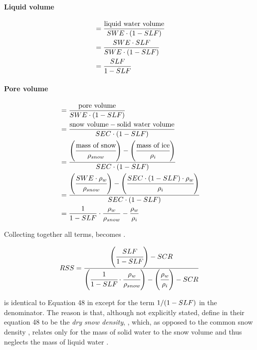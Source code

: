 \paragraph{Liquid volume}
\begin{align*}
  & = \frac{\text{liquid water volume}}{SWE \cdot (1-SLF)} \\
  & = \frac{SWE \cdot SLF}{SWE  \cdot (1-SLF)} \\
  & = \frac{SLF}{1-SLF}
\end{align*}

\paragraph{Pore volume}
\begin{align*}
 & = \frac{\text{pore volume}}{SWE \cdot (1-SLF)} \\
 & = \frac{\text{snow volume} - \text{solid water volume}}{SEC \cdot (1-SLF)} \\
 & = \frac{\left( \cfrac{\text{mass of snow}}{\rho_{snow}} \right) - \left( \cfrac{\text{mass of ice}}{\rho_{i}} \right)}{SEC \cdot (1-SLF)} \\
 & = \frac{ \left( \cfrac{SWE \cdot \rho_{w}}{\rho_{snow}} \right) - \left( \cfrac{SEC \cdot (1-SLF) \cdot \rho_{w}}{\rho_{i}} \right)}{SEC \cdot (1-SLF)} \\
 & = \frac{1}{1-SLF} \cdot \frac{\rho_{w}}{\rho_{snow}} - \frac{\rho_{w}}{\rho_{i}}
\end{align*}

Collecting together all terms,  becomes .

\begin{equation} \label{eqn:snow-enBal_relSat-symb}
  RSS{} = \frac{\left( \cfrac{SLF}{1-SLF} \right)-SCR}{\left( \cfrac{1}{1-SLF} \cdot \cfrac{\rho_{w}}{\rho_{snow}} \right) - \left( \cfrac{\rho_{w}}{\rho_{i}} \right) - SCR}
\end{equation}

 is identical to Equation 48 in \citet{Tarboton1996} except for the term $1/(1-SLF)$ in the denominator. The reason is that, although not explicitly stated, \citet{Tarboton1996} define \densitySnow{} in their equation 48 to be the \emph{dry snow density}, \densitySnowDry{}, which, as opposed to the common snow density \densitySnow{}, relates only for the mass of solid water to the snow volume and thus neglects the mass of liquid water \citep[see Equation 7 in][]{Morris1990}.


